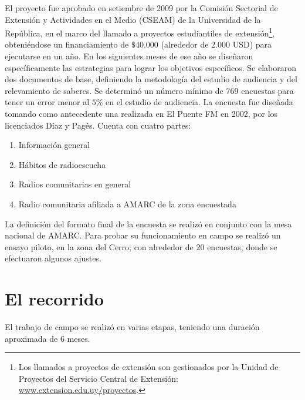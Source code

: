 El proyecto fue aprobado en setiembre de 2009 por la Comisión Sectorial de Extensión y Actividades en el Medio (CSEAM) de la Universidad de la República, en el marco del llamado a proyectos estudiantiles de extensión\footnote{Los llamados a proyectos de extensión son gestionados por la Unidad de Proyectos del Servicio Central de Extensión: \href{http://www.extension.edu.uy/proyectos}{www.extension.edu.uy/proyectos}.}, obteniéndose un financiamiento de $\$$40.000 (alrededor de 2.000 USD) para ejecutarse en un año. En los siguientes meses de ese año se diseñaron específicamente las estrategias para lograr los objetivos específicos. Se elaboraron dos documentos de base, definiendo la metodología del estudio de audiencia y del relevamiento de saberes. Se determinó un número mínimo de 769 encuestas para tener un error menor al $5\%$ en el estudio de audiencia. La encuesta fue diseñada tomando como antecedente una realizada en El Puente FM en 2002, por los licenciados Díaz y Pagés. Cuenta con cuatro partes:\\

\begin{enumerate}
  \item Información general
  \item Hábitos de radioescucha
  \item Radios comunitarias en general
  \item Radio comunitaria afiliada a AMARC de la zona encuestada
\end{enumerate}


La definición del formato final de la encuesta se realizó en conjunto con la mesa nacional de AMARC. Para probar su funcionamiento en campo se realizó un ensayo piloto, en la zona del Cerro, con alrededor de 20 encuestas, donde se efectuaron algunos ajustes.\\

\section{El recorrido}

El trabajo de campo se realizó en varias etapas, teniendo una duración aproximada de 6 meses.\\

